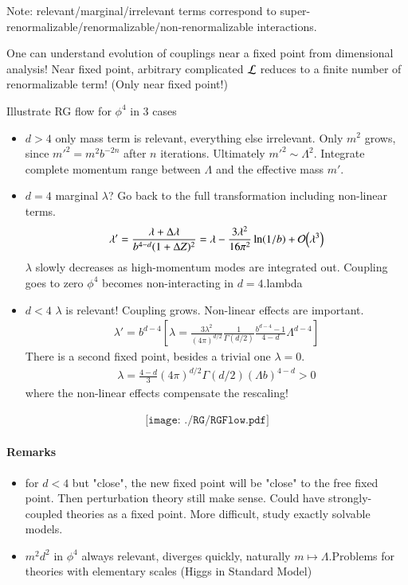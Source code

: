 Note: relevant/marginal/irrelevant terms correspond to super-renormalizable/renormalizable/non-renormalizable interactions.

One can understand evolution of couplings near a fixed point from dimensional analysis! Near fixed point, arbitrary complicated $\mathcal{L}$ reduces to a finite number of renormalizable term! (Only near fixed point!)

Illustrate RG flow for $\phi^4$ in 3 cases
\begin{itemize}
   \item \underline{$d > 4$} only mass term is relevant, everything else irrelevant. Only $m^2$ grows, since $m'^2 = m^2 b^{-2n}$ after $n$ iterations. Ultimately $m'^2 \sim \Lambda^2$. Integrate complete momentum range between $\Lambda$ and the effective mass $m'$.
   \item \underline{$d=4$} marginal $\lambda$? Go back to the full transformation including non-linear terms.
      \begin{align*}
         \lambda' = \frac{\lambda + \Delta \lambda}{b^{4-d} (1+\Delta Z)^2} = \lambda - \frac{3\lambda^2}{16\pi^2} \ln(1/b) + \order{\lambda^3}
      \end{align*}
      $\lambda$ slowly decreases as high-momentum modes are integrated out. Coupling goes to zero $\phi^4$ becomes non-interacting in $d=4$.lambda
   \item \underline{$d < 4$} $\lambda$ is relevant! Coupling grows. Non-linear effects are important. 
      \begin{align*}
         \lambda' = b^{d-4} \left[ \lambda = \frac{3\lambda^2}{(4\pi)^{d/2}} \frac{1}{\Gamma(d/2)} \frac{b^{d-4} - 1}{4-d} \Lambda^{d-4} \right]
      \end{align*}
      There is a second fixed point, besides a trivial one $\lambda = 0$.
      \begin{align*}
         \lambda = \frac{4-d}{3} (4\pi)^{d/2} \Gamma(d/2) (\Lambda b)^{4-d} > 0
      \end{align*}
      where the non-linear effects compensate the rescaling!
\end{itemize}
\begin{align*}
   \texttt{[image: ./RG/RGFlow.pdf]}
\end{align*}

\paragraph{Remarks}
\begin{itemize}
   \item for $d<4$ but "close", the new fixed point will be "close" to the free fixed point. Then perturbation theory still make sense. Could have strongly-coupled theories as a fixed point. More difficult, study exactly solvable models.
   \item $m^2 d^2$ in $\phi^4$ always relevant, diverges quickly, naturally $m \mapsto \Lambda$.Problems for theories with elementary scales (Higgs in Standard Model)
\end{itemize}

